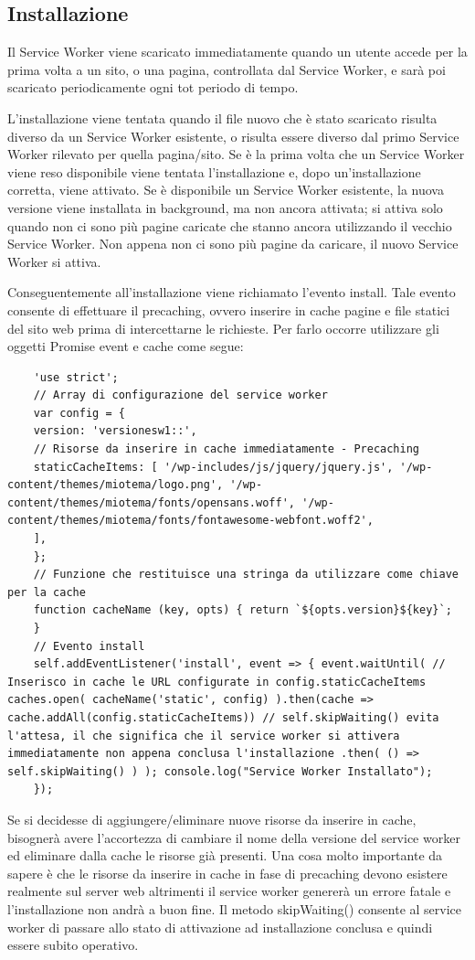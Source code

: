 \documentclass[italian]{article}
\begin{document}
\subsection{Installazione}
Il Service Worker viene scaricato immediatamente quando un utente accede per la prima volta a un sito, o una pagina, controllata dal Service Worker, e sarà poi scaricato periodicamente ogni tot periodo di tempo.

L'installazione viene tentata quando il file nuovo che è stato scaricato risulta diverso da un Service Worker esistente, o risulta essere diverso dal primo Service Worker rilevato per quella pagina/sito. Se è la prima volta che un Service Worker viene reso disponibile viene tentata l'installazione e, dopo un'installazione corretta, viene attivato. Se è disponibile un Service Worker esistente, la nuova versione viene installata in background, ma non ancora attivata; si attiva solo quando non ci sono più pagine caricate che stanno ancora utilizzando il vecchio Service Worker. Non appena non ci sono più pagine da caricare, il nuovo Service Worker si attiva.

Conseguentemente all’installazione viene richiamato l’evento install. Tale evento consente di effettuare il precaching, ovvero inserire in cache pagine e file statici del sito web prima di intercettarne le richieste. Per farlo occorre utilizzare gli oggetti Promise event e cache come segue:
\begin{lstlisting}
	'use strict';
	// Array di configurazione del service worker
	var config = {
	version: 'versionesw1::',
	// Risorse da inserire in cache immediatamente - Precaching
	staticCacheItems: [ '/wp-includes/js/jquery/jquery.js', '/wp-content/themes/miotema/logo.png', '/wp-content/themes/miotema/fonts/opensans.woff', '/wp-content/themes/miotema/fonts/fontawesome-webfont.woff2',
	],
	};
	// Funzione che restituisce una stringa da utilizzare come chiave per la cache
	function cacheName (key, opts) { return `${opts.version}${key}`;
	}
	// Evento install
	self.addEventListener('install', event => { event.waitUntil( // Inserisco in cache le URL configurate in config.staticCacheItems caches.open( cacheName('static', config) ).then(cache => cache.addAll(config.staticCacheItems)) // self.skipWaiting() evita l'attesa, il che significa che il service worker si attivera immediatamente non appena conclusa l'installazione .then( () => self.skipWaiting() ) ); console.log("Service Worker Installato");
	});
\end{lstlisting}
Se si decidesse di aggiungere/eliminare nuove risorse da inserire in cache, bisognerà avere l’accortezza di cambiare il nome della versione del service worker ed eliminare dalla cache le risorse già presenti.
Una cosa molto importante da sapere è che le risorse da inserire in cache in fase di precaching devono esistere realmente sul server web altrimenti il service worker genererà un errore fatale e l’installazione non andrà a buon fine. 
Il metodo skipWaiting() consente al service worker di passare allo stato di attivazione ad installazione conclusa e quindi essere subito operativo.
\end{document}
